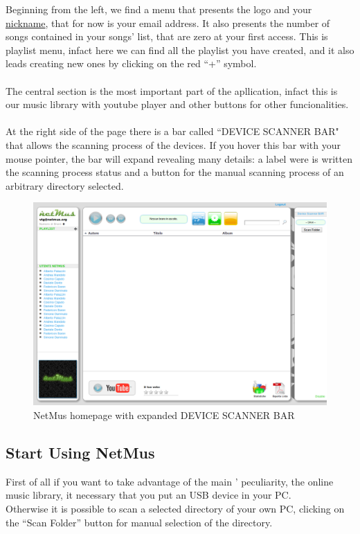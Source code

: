 Beginning from the left, we find a menu that presents the  logo and
your \underline{nickname}, that for now is your email address. It also presents
the number of songs contained in your songs' list, that are zero at your first
access. This is playlist menu, infact here we can find all the playlist you have
created, and it also leads creating new ones by clicking on the red ``+''
symbol.\\
\\
The central section is the most important part of the apllication, infact this
is our music library with youtube player and other buttons for other
funcionalities.\\
\\
At the right side of the page there is a bar called ``DEVICE SCANNER BAR" that
allows the scanning process of the devices. If you hover this bar with your
mouse pointer, the bar will expand revealing many details: a label were is
written  the scanning process status and a button for the manual scanning
process of an arbitrary directory selected.\\

\begin{figure}[htbp]
  \centering
  \includegraphics[width=15cm]{img/MU/applet_bar_open.png}
\caption{NetMus homepage with expanded DEVICE SCANNER BAR}
\end{figure}

\subsection{Start Using NetMus}

First of all if you want to take advantage of the main ' peculiarity,
the online music library, it necessary that you put an USB device in your PC.\\
Otherwise it is possible to scan a selected directory of your own PC, clicking
on the ``Scan Folder'' button for manual selection of the directory.\\ 

